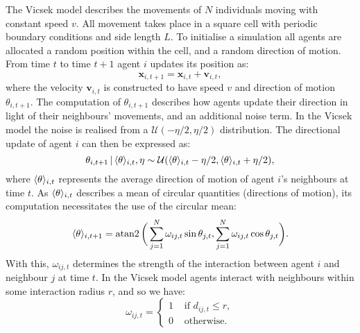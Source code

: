 The Vicsek model describes the movements of $N$ individuals moving with constant speed
$v$. All movement takes place in a square cell with periodic boundary conditions and side
length $L$. To initialise a simulation all agents are allocated a random position within
the cell, and a random direction of motion. From time $t$ to time $t+1$ agent $i$ updates
its position as:
\begin{equation*}
    \bm{x}_{i, t+1} = \bm{x}_{i, t} + \bm{v}_{i, t},
\end{equation*}
where the velocity $\bm{v}_{i,t}$ is constructed to have speed $v$ and direction of
motion $\theta_{i, t+1}$. The computation of $\theta_{i, t+1}$ describes how agents update
their direction in light of their neighbours' movements, and an additional noise term. In
the Vicsek model the noise is realised from a $\mathcal{U}(-\eta/2, \eta/2)$
distribution. The directional update of agent $i$ can then be expressed as:
\begin{equation*}
    \theta_{i, t+1} \,|\, \langle\theta\rangle_{i, t}, \eta \sim
                     \mathcal{U}(\langle\theta\rangle_{i, t} - \eta/2,
                                 \langle\theta\rangle_{i, t} + \eta/2),
\end{equation*}
where $\langle\theta\rangle_{i, t}$ represents the average direction of motion of agent $i$'s
neighbours at time $t$. As $\langle\theta\rangle_{i, t}$ describes a mean of circular
quantities (directions of motion), its computation necessitates the use of the
circular mean:
\begin{equation*}
    \langle\theta\rangle_{i, t+1} = \operatorname{atan2}\bigg(
        \sum_{j=1}^N \omega_{ij, t} \sin\theta_{j,t},
        \sum_{j=1}^N \omega_{ij, t} \cos\theta_{j,t}
    \bigg).
\end{equation*}
With this, $\omega_{ij, t}$ determines the strength of the interaction between agent $i$
and neighbour $j$ at time $t$. In the Vicsek model agents interact with neighbours within
some interaction radius $r$, and so we have:
\begin{equation*}
    \omega_{ij,t} =
    \begin{cases}
        1 & \text{ if } d_{ij, t} \leq r,\\
        0 & \text{ otherwise.}
    \end{cases}
\end{equation*}
